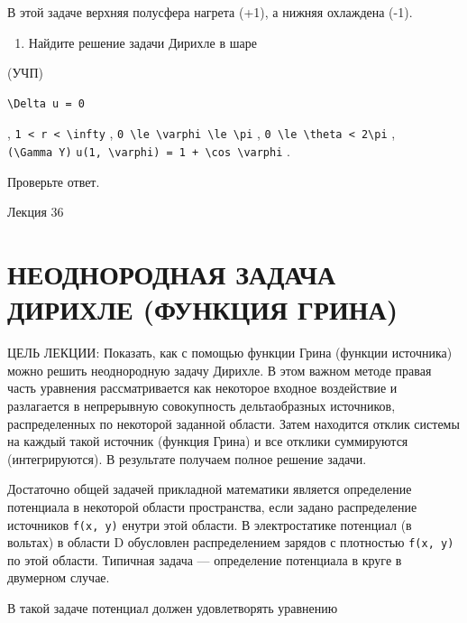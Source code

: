 \documentclass[
  ukrainian,
]{article}
\providecommand{\tightlist}{%
  \setlength{\itemsep}{0pt}\setlength{\parskip}{0pt}}
\begin{document}
В этой задаче верхняя полусфера нагрета (+1), а нижняя охлаждена (-1).

\begin{enumerate}
\def\labelenumi{\arabic{enumi}.}
\setcounter{enumi}{5}
\tightlist
\item
  Найдите решение задачи Дирихле в шаре
\end{enumerate}

(УЧП)

\begin{verbatim}
\Delta u = 0
\end{verbatim}

, \texttt{1\ \textless{}\ r\ \textless{}\ \textbackslash{}infty} ,
\texttt{0\ \textbackslash{}le\ \textbackslash{}varphi\ \textbackslash{}le\ \textbackslash{}pi}
,
\texttt{0\ \textbackslash{}le\ \textbackslash{}theta\ \textless{}\ 2\textbackslash{}pi}
, \texttt{(\textbackslash{}Gamma\ Y)}
\texttt{u(1,\ \textbackslash{}varphi)\ =\ 1\ +\ \textbackslash{}cos\ \textbackslash{}varphi}
.

Проверьте ответ.

Лекция 36

\section{НЕОДНОРОДНАЯ ЗАДАЧА ДИРИХЛЕ (ФУНКЦИЯ
ГРИНА)}\label{ux43dux435ux43eux434ux43dux43eux440ux43eux434ux43dux430ux44f-ux437ux430ux434ux430ux447ux430-ux434ux438ux440ux438ux445ux43bux435-ux444ux443ux43dux43aux446ux438ux44f-ux433ux440ux438ux43dux430}

ЦЕЛЬ ЛЕКЦИИ: Показать, как с помощью функции Грина (функции источника)
можно решить неоднородную задачу Дирихле. В этом важном методе правая
часть уравнения рассматривается как некоторое входное воздействие и
разлагается в непрерывную совокупность дельтаобразных источников,
распределенных по некоторой заданной области. Затем находится отклик
системы на каждый такой источник (функция Грина) и все отклики
суммируются (интегрируются). В результате получаем полное решение
задачи.

Достаточно общей задачей прикладной математики является определение
потенциала в некоторой области пространства, если задано распределение
источников \texttt{f(x,\ y)} енутри этой области. В электростатике
потенциал (в вольтах) в области D обусловлен распределением зарядов с
плотностью \texttt{f(x,\ y)} по этой области. Типичная задача ---
определение потенциала в круге в двумерном случае.

В такой задаче потенциал должен удовлетворять уравнению
\end{document}
